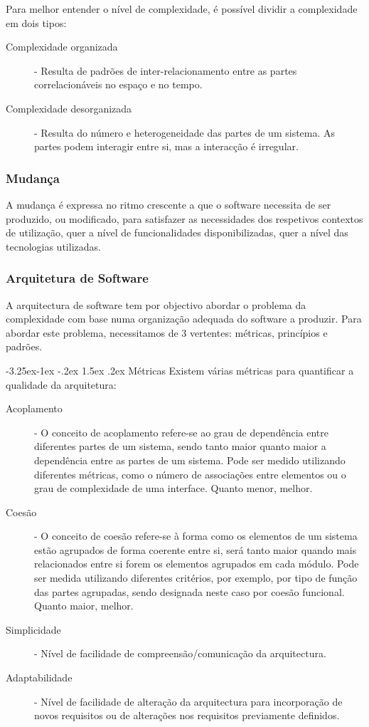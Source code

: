 \documentclass[a4paper,12pt]{article}
\makeatletter
\renewcommand\paragraph{\@startsection{paragraph}{4}{\z@}%
                {-3.25ex\@plus -1ex \@minus -.2ex}%
                {1.5ex \@plus .2ex}%
                {\normalfont\normalsize\bfseries}}
\makeatother
\begin{document}
Para melhor entender o nível de complexidade, é possível dividir a complexidade em dois tipos:
\begin{description}
	\item[Complexidade organizada] - Resulta de padrões de inter-relacionamento entre as partes correlacionáveis no espaço e no tempo. 
	\item[Complexidade desorganizada] - Resulta do número e heterogeneidade das partes de um sistema. As partes podem interagir entre si, mas a interacção é irregular.
\end{description}

\subsubsection{Mudança} \label{mudanca}
A mudança é expressa no ritmo crescente a que o software necessita de ser produzido, ou modificado, para satisfazer as necessidades dos respetivos contextos de utilização, quer a nível de funcionalidades disponibilizadas, quer a nível das tecnologias utilizadas.

\subsubsection{Arquitetura de Software} \label{arquitetura_de_software}
A arquitectura de software tem por objectivo abordar o problema da complexidade com base numa organização adequada do software a produzir.
Para abordar este problema, necessitamos de 3 vertentes: métricas, princípios e padrões.

\paragraph{Métricas} \label{metricas}
Existem várias métricas para quantificar a qualidade da arquitetura:
\begin{description}
	\item[Acoplamento] - O conceito de acoplamento refere-se ao grau de dependência entre diferentes partes de um sistema, sendo tanto maior quanto maior a dependência entre as partes de um sistema. Pode ser medido utilizando diferentes métricas, como o número de associações entre elementos ou o grau de complexidade de uma interface. Quanto menor, melhor.
	\item[Coesão] - O conceito de coesão refere-se à forma como os elementos de um sistema estão agrupados de forma coerente entre si, será tanto maior quando mais relacionados entre si forem os elementos agrupados em cada módulo. Pode ser medida utilizando diferentes critérios, por exemplo, por tipo de função das partes agrupadas, sendo designada neste caso por coesão funcional. Quanto maior, melhor.
	\item[Simplicidade] - Nível de facilidade de compreensão/comunicação da arquitectura.
	\item[Adaptabilidade] - Nível de facilidade de alteração da arquitectura para incorporação de novos requisitos ou de alterações nos requisitos previamente definidos.
\end{description}
\end{document}
